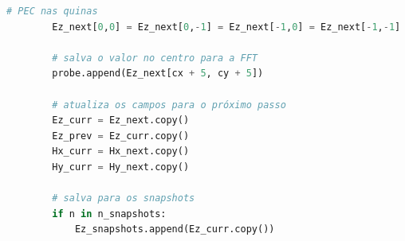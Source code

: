 \begin{anexosenv}
\begin{lstlisting}[language=Python, breaklines=true, basicstyle=\tiny]
        # PEC nas quinas
        Ez_next[0,0] = Ez_next[0,-1] = Ez_next[-1,0] = Ez_next[-1,-1]

        # salva o valor no centro para a FFT
        probe.append(Ez_next[cx + 5, cy + 5])

        # atualiza os campos para o próximo passo
        Ez_curr = Ez_next.copy()
        Ez_prev = Ez_curr.copy()
        Hx_curr = Hx_next.copy()
        Hy_curr = Hy_next.copy()

        # salva para os snapshots
        if n in n_snapshots:
            Ez_snapshots.append(Ez_curr.copy())
        
    \end{lstlisting}


\end{anexosenv}
